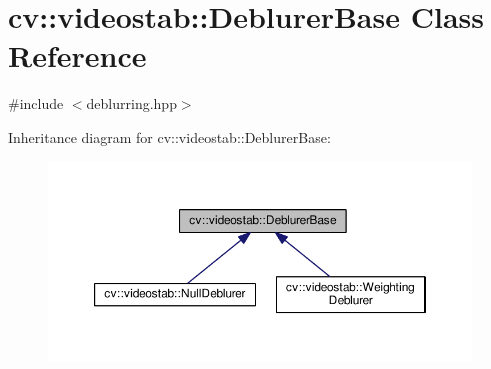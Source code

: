 \hypertarget{classcv_1_1videostab_1_1DeblurerBase}{\section{cv\-:\-:videostab\-:\-:Deblurer\-Base Class Reference}
\label{classcv_1_1videostab_1_1DeblurerBase}
}


{\ttfamily \#include $<$deblurring.\-hpp$>$}



Inheritance diagram for cv\-:\-:videostab\-:\-:Deblurer\-Base\-:\nopagebreak
\begin{figure}[H]
\begin{center}
\leavevmode
\includegraphics[width=350pt]{classcv_1_1videostab_1_1DeblurerBase__inherit__graph}
\end{center}
\end{figure}
